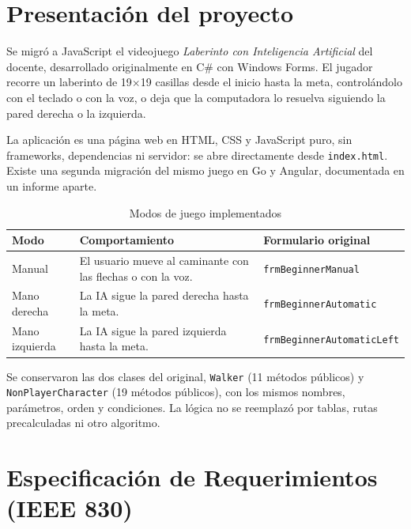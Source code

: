 \documentclass[12pt,a4paper]{article}
\begin{document}
\section{Presentación del proyecto}
Se migró a JavaScript el videojuego \emph{Laberinto con Inteligencia Artificial}
del docente, desarrollado originalmente en C\# con Windows Forms. El jugador
recorre un laberinto de 19$\times$19 casillas desde el inicio hasta la meta,
controlándolo con el teclado o con la voz, o deja que la computadora lo resuelva
siguiendo la pared derecha o la izquierda.

La aplicación es una página web en HTML, CSS y JavaScript puro, sin frameworks,
dependencias ni servidor: se abre directamente desde \texttt{index.html}. Existe
una segunda migración del mismo juego en Go y Angular, documentada en un informe
aparte.

\begin{table}[H]
\centering
\caption{Modos de juego implementados}
\begin{tabular}{p{2.8cm}p{5cm}p{5.6cm}}
\toprule
\textbf{Modo} & \textbf{Comportamiento} & \textbf{Formulario original}\\
\midrule
Manual & El usuario mueve al caminante con las flechas o con la voz. & \texttt{frmBeginnerManual}\\
Mano derecha & La IA sigue la pared derecha hasta la meta. & \texttt{frmBeginnerAutomatic}\\
Mano izquierda & La IA sigue la pared izquierda hasta la meta. & \texttt{frmBeginnerAutomaticLeft}\\
\bottomrule
\end{tabular}
\end{table}

Se conservaron las dos clases del original, \texttt{Walker} (11 métodos públicos)
y \texttt{NonPlayerCharacter} (19 métodos públicos), con los mismos nombres,
parámetros, orden y condiciones. La lógica no se reemplazó por tablas, rutas
precalculadas ni otro algoritmo.

\section{Especificación de Requerimientos (IEEE 830)}
\end{document}
